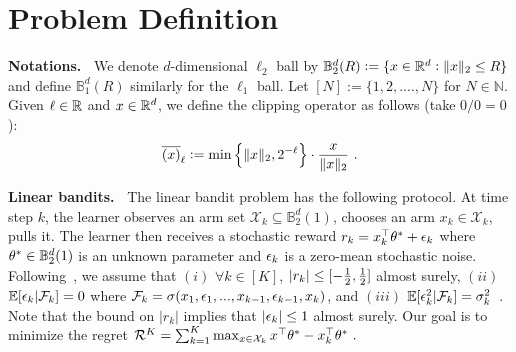 \documentclass{article}
\def\BB{\mathbb{B}}
\def\clip#1{\wbar{\del{#1}}}
\newcommand{\blue}[1]{{\color[rgb]{.3,.5,1}#1}}
\renewcommand{\blue}[1]{#1}
\begin{document}
\section{Problem Definition}
\label{sec:prelim}

\textbf{Notations.~}
We denote $d$-dimensional $\ell_2$ ball by ${\BB_2^d(R)} := \{x \in \RR^d: \|x\|_2 \leq R\}$ and define $\BB_1^d(R)$ similarly for the $\ell_1$ ball.
Let ${[N]} := \{1,2,.\ldots,N\}$ for $N\in \mathbb{N}$. 
Given $\ell\in{\mathbb{R}}$ and $x\in{\mathbb{R}}^d$, we define the clipping operator as follows (take $0/0 = 0$):
\begin{align}\label{eq:clipping}
    {\clip{x}_\ell} := \min\cbr{\|x\|_2 , 2^{-\ell} } \cd \fr{x}{ \|x\|_2 } ~.
\end{align}

\textbf{Linear bandits.~}
The linear bandit problem has the following protocol.
At time step $k$, the learner observes an arm set $\blue{\mathcal{X}_k} \subseteq \mathbb{B}_2^d(1)$, chooses an arm $x_k \in \mathcal{X}_k$, pulls it.
The learner then receives a stochastic reward 
$r_k = x_k^{\top} {\theta}^*+\epsilon_k$ where ${\theta}^* \in \mathbb{B}_2^d(1)$ is an unknown parameter and $\epsilon_k$ is a zero-mean stochastic noise.
Following~\cite{zhang21variance}, we assume that $(i)$ $\forall k \in [K]$, $|r_k|\le [-{ \frac{1}{2} },{ \frac{1}{2} }]$ almost surely, $(ii)$ $\mathbb{E}[\epsilon_k | \mathcal{F}_k]=0$ where $\mathcal{F}_k=\sigma(x_1,\epsilon_1,...,x_{k-1},\epsilon_{k-1}, x_k)$, and $(iii)$ $\mathbb{E}[\epsilon_k^2|\mathcal{F}_k]=\sigma_k^2$~.
Note that the bound on $|r_k|$ implies that $|\epsilon_k| \le 1$ almost surely.
Our goal is to minimize the regret %
$   \mathcal{R}^K = \sum_{k=1}^K \max_{x\in \mathcal{X}_k} x^{\top}{\theta}^*-x_k^{\top} {\theta}^* ~.
$
\end{document}
